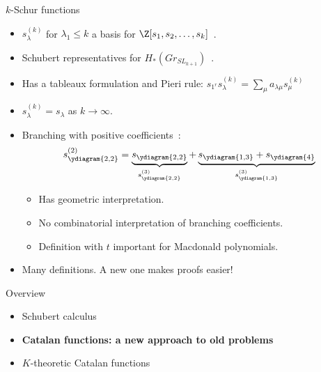 \documentclass{beamer}
\begin{document}
\begin{frame}{\(k\)-Schur functions}
  \begin{itemize}
  \item \(s_\lambda^{(k)}\) for \(\lambda_1 \leq k\) a basis for
    \(\Z[s_1, s_2, \ldots, s_k]\)~\cite{lapointe-lascoux-morse}. \pause
  \item Schubert representatives for \(H_*(Gr_{SL_{k+1}})\)~\cite{Lam08}. \pause
  \item Has a tableaux formulation and Pieri rule: \(s_{1^r}
    s_\lambda^{(k)} = \sum_{\mu} a_{\lambda \mu} s_\mu^{(k)}\) \pause
  \item \(s_\lambda^{(k)} = s_\lambda\) as \(k \to \infty\).\pause
  \item Branching with positive coefficients~\cite{llms}:
      \[s_{\ydiagram{2,2}}^{(2)} =
        \underbrace{s_{\ydiagram{2,2}}}_{s^{(3)}_{\ydiagram{2,2}}}+\underbrace{s_{\ydiagram{1,3}}+s_{\ydiagram{4}}}_{s_{\ydiagram{1,3}}^{(3)}}\] \pause
      \begin{itemize}
      \item Has geometric interpretation.\pause     
      \item No combinatorial interpretation of branching coefficients.\pause
      \item Definition with \(t\) important for Macdonald polynomials.\pause
      \end{itemize}
   \item Many definitions. A new one makes proofs easier!
  \end{itemize}
\end{frame}
\begin{frame}{Overview}
  \begin{itemize}
  \item Schubert calculus
  \item \textbf{Catalan functions: a new approach to old problems}
  \item \(K\)-theoretic Catalan functions
  \end{itemize}
\end{frame}
\end{document}
